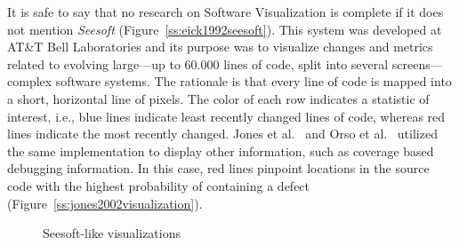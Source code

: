 It is safe to say that no research on Software Visualization is complete if it
does not mention \textit{Seesoft} (Figure~\ref{ss:eick1992seesoft}). This system
was developed at AT\&T Bell Laboratories and its purpose was to visualize
changes and metrics related to evolving large---up to 60.000 lines of code,
split into several screens---complex software systems. The rationale is that
every line of code is mapped into a short, horizontal line of pixels. The color
of each row indicates a statistic of interest, i.e., blue lines indicate least
recently changed lines of code, whereas red lines indicate the most recently
changed.
Jones et al.~\cite{jones2002visualization} and Orso et
al.~\cite{orso2004gammatella} utilized the same implementation to display other
information, such as coverage based debugging information. In this case, red
lines pinpoint locations in the source code with the highest probability of
containing a defect (Figure~\ref{ss:jones2002visualization}).

\begin{figure}
    \centering
    \caption{Seesoft-like visualizations}
\end{figure}

